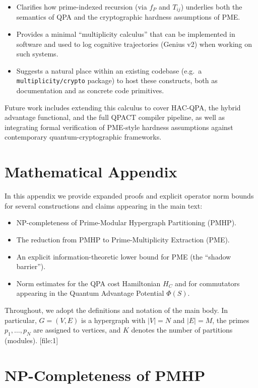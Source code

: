 \documentclass[11pt]{article}
\begin{document}
\begin{itemize}
  \item Clarifies how prime-indexed recursion (via $f_P$ and $T_{ij}$) underlies both the semantics of QPA and the cryptographic hardness assumptions of PME.
  \item Provides a minimal ``multiplicity calculus'' that can be implemented in software and used to log cognitive trajectories (Genius v2) when working on such systems.
  \item Suggests a natural place within an existing codebase (e.g.\ a \texttt{multiplicity/crypto} package) to host these constructs, both as documentation and as concrete code primitives.
\end{itemize}

Future work includes extending this calculus to cover HAC-QPA, the hybrid advantage functional, and the full QPACT compiler pipeline, as well as integrating formal verification of PME-style hardness assumptions against contemporary quantum-cryptographic frameworks.

\appendix
\section{Mathematical Appendix}

In this appendix we provide expanded proofs and explicit operator norm bounds for several constructions and claims appearing in the main text:
\begin{itemize}
  \item NP-completeness of Prime-Modular Hypergraph Partitioning (PMHP).
  \item The reduction from PMHP to Prime-Multiplicity Extraction (PME).
  \item An explicit information-theoretic lower bound for PME (the ``shadow barrier'').
  \item Norm estimates for the QPA cost Hamiltonian $H_C$ and for commutators appearing in the Quantum Advantage Potential $\Phi(S)$.
\end{itemize}

Throughout, we adopt the definitions and notation of the main body. In particular, $G=(V,E)$ is a hypergraph with $|V|=N$ and $|E|=M$, the primes $p_1,\dots,p_N$ are assigned to vertices, and $K$ denotes the number of partitions (modules). [file:1]

\section{NP-Completeness of PMHP}
\label{app:pmhp-np}
\end{document}

